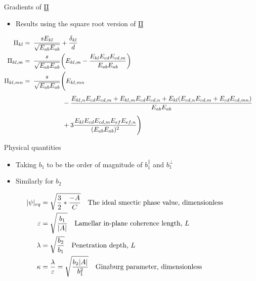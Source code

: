 \documentclass[10pt,mathserif]{beamer}
\newcommand{\duf}[2]{\stackunder[0.5pt]{\stackunder[0.8pt]{\stackunder[1pt]{\ensuremath{#1}}{\rule{\widthof{\ensuremath{#2}}*\real{0.9}}{.1ex}}}{\rule{\widthof{\ensuremath{#2}}*\real{0.9}}{.1ex}}}{}}
\newcommand{\du}[1]{\duf{#1}{#1}}
\newcommand{\PP}{\ensuremath{\du{\Pi}}}
\begin{document}
\begin{frame}[fragile]{Gradients of \PP}
    \newrefsection
    \begin{itemize}
        \item Results using the square root version of \PP
    \end{itemize}
    \scriptsize
    \begin{align*}
        \Pi_{kl} =&\enspace \frac{s E_{kl}}{\sqrt{E_{ab}E_{ab}}} + \frac{\delta_{kl}}{d} \\
        \Pi_{kl,m} =&\enspace \frac{s}{\sqrt{E_{ab}E_{ab}}} \qty(E_{kl,m} - \frac{E_{kl}E_{cd}E_{cd,m}}{E_{ab}E_{ab}}) \\
        \Pi_{kl,mn} =&\enspace \frac{s}{\sqrt{E_{ab}E_{ab}}} \Biggl(E_{kl,mn} \\ 
        &\phantom{\frac{s}{\sqrt{E_{ab}E_{ab}}} \Biggl(} -\frac{E_{kl,n}E_{cd}E_{cd,m} + E_{kl,m}E_{cd}E_{cd,n} + E_{kl}(E_{cd,n}E_{cd,m} + E_{cd}E_{cd,mn})}{E_{ab}E_{ab}} \\
        &\phantom{\frac{s}{\sqrt{E_{ab}E_{ab}}} \Biggl(} + 3\frac{E_{kl}E_{cd}E_{cd,m}E_{ef}E_{ef,n}}{(E_{ab}E_{ab})^2} \Biggr)
    \end{align*}
    \normalsize
\end{frame}

\begin{frame}[fragile]{Physical quantities}
    \newrefsection
    \begin{itemize}
        \item Taking $b_1$ to be the order of magnitude of $b_1^\parallel$ and $b_1^\perp$
        \item Similarly for $b_2$
    \end{itemize}
    \small
    \begin{align*}
        |\psi|_{eq} &= \sqrt{\frac{3}{2} * \frac{-A}{C}} \qq{The ideal smectic phase value, dimensionless}\\
        \varepsilon &= \sqrt{\frac{b_1}{|A|}} \qq{Lamellar in-plane coherence length, $L$} \\
        \lambda &= \sqrt{\frac{b_2}{b_1}} \qq{Penetration depth, $L$} \\
        \kappa &= \frac{\lambda}{\varepsilon} = \sqrt{\frac{b_2|A|}{b_1^2}} \qq{Ginzburg parameter, dimensionless}
    \end{align*}
\end{frame}
\end{document}
